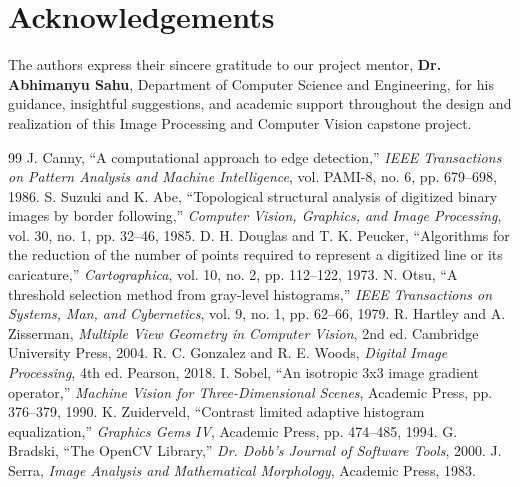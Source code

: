 \documentclass[11pt,a4paper]{article}
\begin{document}
\section*{Acknowledgements}
The authors express their sincere gratitude to our project mentor, \textbf{Dr. Abhimanyu Sahu}, Department of Computer Science and Engineering, for his guidance, insightful suggestions, and academic support throughout the design and realization of this Image Processing and Computer Vision capstone project.

\begin{thebibliography}{99}
\small
{} J. Canny, ``A computational approach to edge detection,'' \textit{IEEE Transactions on Pattern Analysis and Machine Intelligence}, vol. PAMI-8, no. 6, pp. 679--698, 1986.
 S. Suzuki and K. Abe, ``Topological structural analysis of digitized binary images by border following,'' \textit{Computer Vision, Graphics, and Image Processing}, vol. 30, no. 1, pp. 32--46, 1985.
 D. H. Douglas and T. K. Peucker, ``Algorithms for the reduction of the number of points required to represent a digitized line or its caricature,'' \textit{Cartographica}, vol. 10, no. 2, pp. 112--122, 1973.
 N. Otsu, ``A threshold selection method from gray-level histograms,'' \textit{IEEE Transactions on Systems, Man, and Cybernetics}, vol. 9, no. 1, pp. 62--66, 1979.
 R. Hartley and A. Zisserman, \textit{Multiple View Geometry in Computer Vision}, 2nd ed. Cambridge University Press, 2004.
 R. C. Gonzalez and R. E. Woods, \textit{Digital Image Processing}, 4th ed. Pearson, 2018.
 I. Sobel, ``An isotropic 3x3 image gradient operator,'' \textit{Machine Vision for Three-Dimensional Scenes}, Academic Press, pp. 376--379, 1990.
 K. Zuiderveld, ``Contrast limited adaptive histogram equalization,'' \textit{Graphics Gems IV}, Academic Press, pp. 474--485, 1994.
 G. Bradski, ``The OpenCV Library,'' \textit{Dr. Dobb's Journal of Software Tools}, 2000.
 J. Serra, \textit{Image Analysis and Mathematical Morphology}, Academic Press, 1983.
\end{thebibliography}
\end{document}

